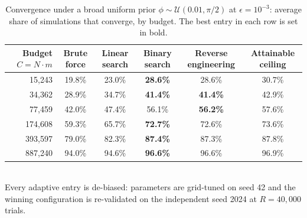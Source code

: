 \begin{table}[ht]
\centering
\small
\caption{Convergence under a broad uniform prior $\phi\sim\mathcal{U}(0.01,\pi/2)$ at $\epsilon=10^{-3}$: average share of simulations that converge, by budget. The best entry in each row is set in bold.}
\label{tab:broad-pi2}
\begin{tabular}{rccccc}
\toprule
Budget $C=N\cdot m$
& Brute force
& Linear search
& Binary search
& Reverse engineering
& Attainable ceiling \\
\midrule
15{,}243
& 19.8\%
& 23.0\%
& \textbf{28.6\%}
& 28.6\%
& 30.7\% \\
34{,}362
& 28.9\%
& 34.7\%
& \textbf{41.4\%}
& \textbf{41.4\%}
& 42.9\% \\
77{,}459
& 42.0\%
& 47.4\%
& 56.1\%
& \textbf{56.2\%}
& 57.6\% \\
174{,}608
& 59.3\%
& 65.7\%
& \textbf{72.7\%}
& 72.6\%
& 73.6\% \\
393{,}597
& 79.0\%
& 82.3\%
& \textbf{87.4\%}
& 87.3\%
& 87.8\% \\
887{,}240
& 94.0\%
& 94.6\%
& \textbf{96.6\%}
& 96.6\%
& 96.9\% \\
\bottomrule
\end{tabular}
\\[2pt]
\footnotesize Every adaptive entry is de-biased: parameters are grid-tuned on seed 42 and the winning configuration is re-validated on the independent seed 2024 at $R=40{,}000$ trials.
\end{table}
